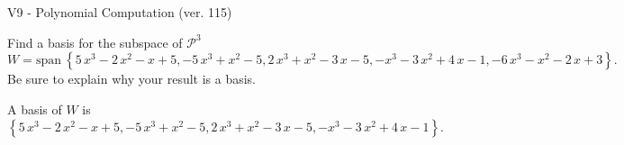\begin{exercise}
  \begin{exerciseTitle}V9 - Polynomial Computation (ver. 115)\end{exerciseTitle}
  \begin{exerciseStatement}
    Find a basis for the subspace of \(\mathcal{P}^3\) 
\[W=\mathrm{span}\ \left\{5 \, x^{3} - 2 \, x^{2} - x + 5 , -5 \, x^{3} + x^{2} - 5 , 2 \, x^{3} + x^{2} - 3 \, x - 5 , -x^{3} - 3 \, x^{2} + 4 \, x - 1 , -6 \, x^{3} - x^{2} - 2 \, x + 3\right\}.\]
 Be sure to explain why your result is a basis.


  \end{exerciseStatement}
  \begin{exerciseAnswer}
   A basis of \(W\) is  \(\left\{5 \, x^{3} - 2 \, x^{2} - x + 5 , -5 \, x^{3} + x^{2} - 5 , 2 \, x^{3} + x^{2} - 3 \, x - 5 , -x^{3} - 3 \, x^{2} + 4 \, x - 1\right\}\).
  


  \end{exerciseAnswer}
\end{exercise}